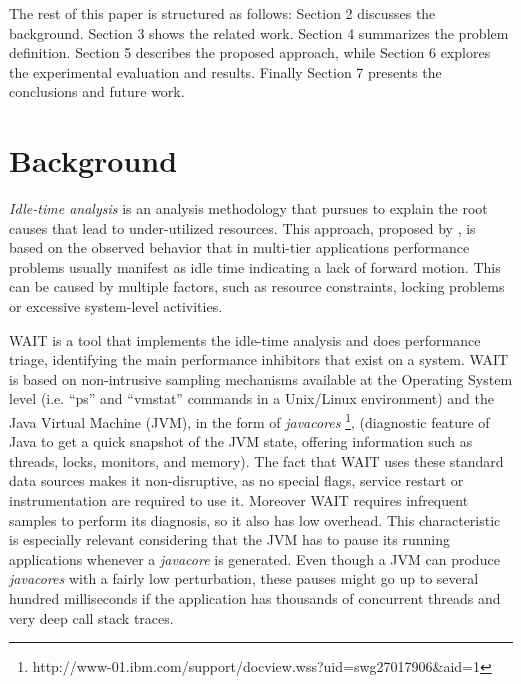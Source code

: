 \documentclass[runningheads,a4paper]{llncs}
\begin{document}
The rest of this paper is structured as follows: Section 2 discusses the
background. Section 3 shows the related work. Section 4 summarizes the
problem definition. Section 5 describes the proposed approach, while Section 6
explores the experimental evaluation and results. Finally Section 7 presents the
conclusions and future work.

\vspace{-5pt}
\section{Background}
\vspace{-5pt}
\emph{Idle-time analysis} is an analysis methodology that pursues to
explain the root causes that lead to under-utilized resources. This approach,
proposed by \cite{Altman2010}, is based on the observed behavior that in
multi-tier applications performance problems usually manifest as idle time
indicating a lack of forward motion. This can be caused by multiple factors,
such as resource constraints, locking problems or excessive system-level activities.

WAIT is a tool that implements the idle-time analysis and does performance
triage, identifying the main performance inhibitors that exist on a system. WAIT
is based on non-intrusive sampling mechanisms available at the Operating System
level (i.e. ``ps'' and ``vmstat'' commands in a Unix/Linux environment) and the
Java Virtual Machine (JVM), in the form of \emph{javacores}
\footnote{http://www-01.ibm.com/support/docview.wss?uid=swg27017906\&aid=1}, 
(diagnostic feature of Java to get a quick snapshot of
the JVM state, offering information such as threads, locks, monitors,
and memory). The fact that WAIT uses these standard data sources makes it
non-disruptive, as no special flags, service restart or instrumentation are
required to use it. Moreover WAIT requires infrequent samples to perform its
diagnosis, so it also has low overhead. This characteristic is especially
relevant considering that the JVM has to pause its running applications whenever a
\emph{javacore} is generated. Even though a JVM can produce \emph{javacores}
with a fairly low perturbation, these pauses might go up to several hundred
milliseconds if the application has thousands of concurrent threads and very
deep call stack traces. 
\end{document}
